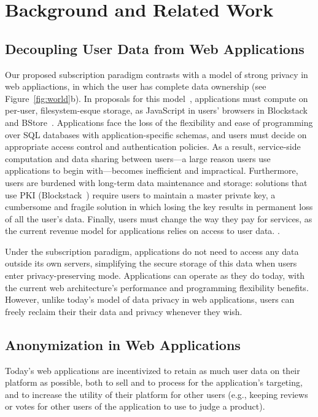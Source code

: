\section{Background and Related Work}
\subsection{Decoupling User Data from Web Applications}
Our proposed subscription paradigm contrasts with a model of strong privacy in web appliactions, in
which the user has complete data ownership (see Figure~\ref{fig:world}b). In proposals for this
model~\cite{amber, w5, blockstack, bstore}, applications must compute on per-user, filesystem-esque
storage, \eg as JavaScript in users' browsers in Blockstack~\cite{blockstack} and
BStore~\cite{bstore}. Applications face the loss of the flexibility and ease of programming over SQL
databases with application-specific schemas, and users must decide on appropriate access control and
authentication policies. As a result, service-side computation and data sharing between users---a
large reason users use applications to begin with---becomes inefficient and impractical. 
%
Furthermore, users are burdened with long-term data maintenance and storage: solutions that use PKI
(\eg Blockstack~\cite{blockstack}) require users to maintain a
master private key, a cumbersome and fragile solution in which losing the key results in permanent
loss of all the user's data.
%
Finally, users must change the way they pay for services, as the current revenue model for
applications relies on access to user data. 
.

Under the subscription paradigm, applications do not need to access any data outside its own
servers, simplifying the secure storage of this data when users enter privacy-preserving mode.
Applications can operate as they do today, with the current web architecture's performance and
programming flexibility benefits. However, unlike today's model of data privacy in web applications,
users can freely reclaim their their data and privacy whenever they wish.

\subsection{Anonymization in Web Applications}
Today's web applications are incentivized to retain as much user data on their platform as possible,
both to sell and to process for the application's targeting, and to increase the utility of their
platform for other users (e.g., keeping reviews or votes for other users of the application to use
to judge a product).

